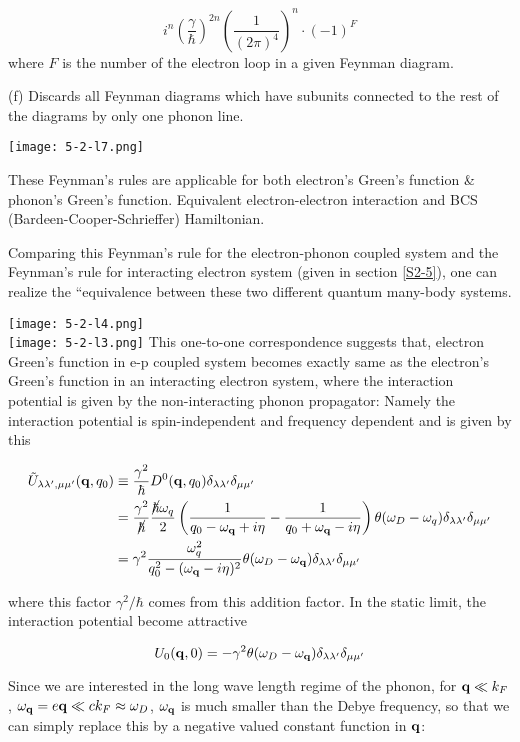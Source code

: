\[i^n\left(\frac{\gamma}{\hbar}\right)^{2n}\left(\frac{1}{(2\pi)^4}\right)^n\cdot(-1)^F \]
where $F$ is the number of the electron loop in a given Feynman diagram. 

\noindent (f) Discards all Feynman diagrams which have subunits connected to the rest of the diagrams by only one phonon line. 

\texttt{[image: 5-2-l7.png]}

These Feynman's rules are applicable for both electron's Green's function \& phonon's Green's function. Equivalent electron-electron interaction and BCS (Bardeen-Cooper-Schrieffer) Hamiltonian. 

Comparing this Feynman's rule for the electron-phonon coupled system and the Feynman's rule for interacting electron system (given in section \ref{S2-5}), one can realize the ``equivalence between these two different quantum many-body systems. 

\newpage
\texttt{[image: 5-2-l4.png]}\\
\texttt{[image: 5-2-l3.png]}
\newpage
This one-to-one correspondence suggests that, electron Green's function in e-p coupled system becomes exactly same as the electron's Green's function in an interacting electron system, where the interaction potential is given by the non-interacting phonon propagator: Namely the interaction potential is spin-independent and frequency dependent and is given by this

\[\begin{split}
\tilde{U}_{\lambda\lambda',\mu\mu'}({\bf q},q_0)&\equiv\frac{\gamma^2}{\hbar}D^0({\bf q},q_0)\delta_{\lambda\lambda'}\delta_{\mu\mu'}\\
&=\frac{\gamma^2}{\cancel\hbar}\frac{\cancel{\hbar}\omega_q}{2}\left(\frac{1}{q_0-\omega_{\bf q}+i\eta} - \frac{1}{q_0+\omega_{\bf q}-i\eta}\right)\theta(\omega_D-\omega_q)\delta_{\lambda\lambda'}\delta_{\mu\mu'}\\
&=\gamma^2\frac{\omega_q^2}{q_0^2-(\omega_{\bf q}-i\eta)^2}\theta(\omega_D-\omega_{\bf q})\delta_{\lambda\lambda'}\delta_{\mu\mu'}
\end{split} \]

where this factor $\gamma^2/\hbar$ comes from this addition factor. In the static limit, the interaction potential become attractive

\[ U_0({\bf q},0) = -\gamma^2\theta(\omega_D-\omega_{\bf q})\delta_{\lambda\lambda'}\delta_{\mu\mu'}\]

Since we are interested in the long wave length regime of the phonon, for ${\bf q}\ll k_F$, $\omega_{\bf q} = e{\bf q} \ll ck_F\approx\omega_D$, $\omega_{\bf q}$ is much smaller than the Debye frequency, so that we can simply replace this by a negative valued constant function in $\bf q$:

